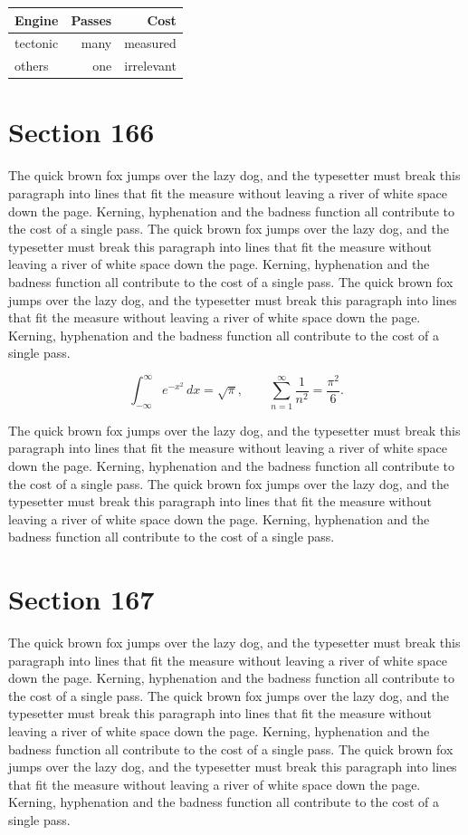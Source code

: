 \documentclass{article}
\begin{document}
\begin{center}
\begin{tabular}{lrr}
\toprule
Engine & Passes & Cost \\
\midrule
tectonic & many & measured \\
others & one & irrelevant \\
\bottomrule
\end{tabular}
\end{center}

\section{Section 166}
The quick brown fox jumps over the lazy dog, and the typesetter must break this paragraph into lines that fit the measure without leaving a river of white space down the page. Kerning, hyphenation and the badness function all contribute to the cost of a single pass. The quick brown fox jumps over the lazy dog, and the typesetter must break this paragraph into lines that fit the measure without leaving a river of white space down the page. Kerning, hyphenation and the badness function all contribute to the cost of a single pass. The quick brown fox jumps over the lazy dog, and the typesetter must break this paragraph into lines that fit the measure without leaving a river of white space down the page. Kerning, hyphenation and the badness function all contribute to the cost of a single pass. 

\begin{equation}
\int_{-\infty}^{\infty} e^{-x^{2}}\,dx = \sqrt{\pi}, \qquad
\sum_{n=1}^{\infty} \frac{1}{n^{2}} = \frac{\pi^{2}}{6}.
\end{equation}

The quick brown fox jumps over the lazy dog, and the typesetter must break this paragraph into lines that fit the measure without leaving a river of white space down the page. Kerning, hyphenation and the badness function all contribute to the cost of a single pass. The quick brown fox jumps over the lazy dog, and the typesetter must break this paragraph into lines that fit the measure without leaving a river of white space down the page. Kerning, hyphenation and the badness function all contribute to the cost of a single pass. 
\section{Section 167}
The quick brown fox jumps over the lazy dog, and the typesetter must break this paragraph into lines that fit the measure without leaving a river of white space down the page. Kerning, hyphenation and the badness function all contribute to the cost of a single pass. The quick brown fox jumps over the lazy dog, and the typesetter must break this paragraph into lines that fit the measure without leaving a river of white space down the page. Kerning, hyphenation and the badness function all contribute to the cost of a single pass. The quick brown fox jumps over the lazy dog, and the typesetter must break this paragraph into lines that fit the measure without leaving a river of white space down the page. Kerning, hyphenation and the badness function all contribute to the cost of a single pass. 
\end{document}
